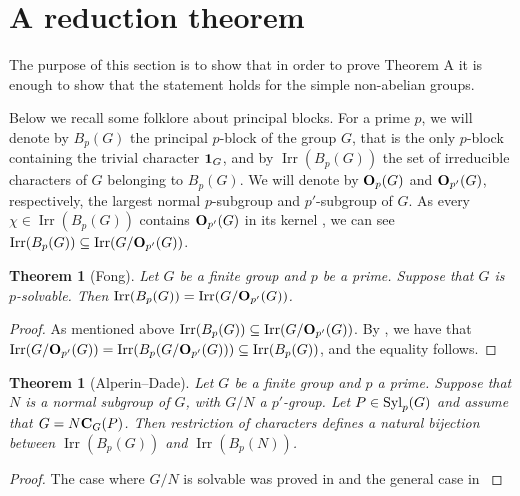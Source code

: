 \documentclass[a4paper,12pt,leqno]{amsart}
\def\irr#1{{\Irr}(#1)}
\def\syl#1#2{{\rm Syl}_{#1}(#2)}
\def\cent#1#2{{\bf C}_{#1}(#2)}
\def\sbs{\subseteq}
\newcommand{\6}{^}
\newcommand{\Irr}{\operatorname{Irr}}
\newtheorem{thm}[subsection]{Theorem}
\theoremstyle{definition}
\theoremstyle{definition}
\theoremstyle{definition}
\theoremstyle{definition}
\theoremstyle{definition}
\begin{document}
\section{A reduction theorem}\label{sec:1}

The purpose of this section is to show that in order to prove Theorem A it is enough to show that the statement holds for the simple non-abelian groups. 


Below we recall some folklore about principal blocks.  For a prime $p$, we will denote by $B_p(G)$ the principal $p$-block of the group $G$, that is the only $p$-block containing the trivial character ${\bf 1}_G$, and by $\irr{B_p(G)} $ the set of irreducible characters of $G$ belonging to $B_p(G)$. 
We will denote by ${\bf O}_p (G)$ and ${\bf O}_{p'}(G)$, respectively, the largest normal $p$-subgroup and $p'$-subgroup of $G$. As every $\chi\in \irr{B_p(G)}$ contains ${\bf O}_{p'}(G)$ in its kernel \cite[Theorem 6.10]{Nav98}, we can see $\irr{B_p(G)}\sbs \irr{G/{\bf O}_{p'}(G)}$.


\begin{thm}[Fong]\label{thm:Fong} Let $G$ be a finite group and $p$ be a prime. Suppose that $G$ is $p$-solvable. Then 
$\irr{B_p(G)}=\irr {G/{\bf O}_{p'}(G)}$.
\end{thm}
\begin{proof} As mentioned above $\irr{B_p(G)}\sbs \irr{G/{\bf O}_{p'}(G)}$. 
By \cite[Lemma 3A]{Fon61}, we have that $\irr{G/{\bf O}_{p'}(G)}=\irr{B_p(G/{\bf O}_{p'}(G))}\sbs \irr{B_p(G)}$, and the equality follows. 
\end{proof}


\begin{thm}[Alperin--Dade]\label{thm:Alperin-Dade}
Let $G$ be a finite group and $p$ a prime. 
Suppose that $N$ is a normal subgroup of $G$, with $G/N$ a $p'$-group.
Let $P \in \syl p G$ and assume that $G=N\cent GP$. Then restriction of characters defines
a natural bijection between $\irr{B_p(G)}$ and $\irr{B_p(N)}$.
\end{thm}

\begin{proof}
The case where $G/N$ is solvable was proved in \cite{Alp76} and the general case
in \cite{Dad77}
\end{proof}
\end{document}
